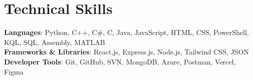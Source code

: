 \section{Technical Skills}
 \begin{itemize}[leftmargin=0.15in, label={}]
    \small{\item{
      \textbf{Languages}{: Python, C++, C\#, C, Java, JavaScript, HTML, CSS, PowerShell, KQL, SQL, Assembly, MATLAB} \\
      \textbf{Frameworks \& Libraries}{: React.js, Express.js, Node.js, Tailwind CSS, JSON} \\
      \textbf{Developer Tools}{: Git, GitHub, SVN, MongoDB, Azure, Postman, Vercel, Figma} \\
      }}
\end{itemize} 